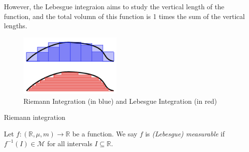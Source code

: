 However, the Lebesgue integraion aims to study the vertical length of the function, and the total volumn of this function is 1 times the sum of the vertical lengths.
\begin{figure}
\centering
\includegraphics[width=0.45\textwidth]{week9/p_1}
\caption{Riemann Integration (in blue) and Lebesgue Integration (in red)}
\end{figure}
Riemann integration


\begin{definition}[Measurable]
Let $f:(\mathbb{R},\mu,m)\to\mathbb{R}$ be a function.
We say $f$ is \emph{(Lebesgue) measurable} if $f^{-1}(I)\in\mathcal{M}$ for all intervals $I\subseteq\mathbb{R}$.
\end{definition}

